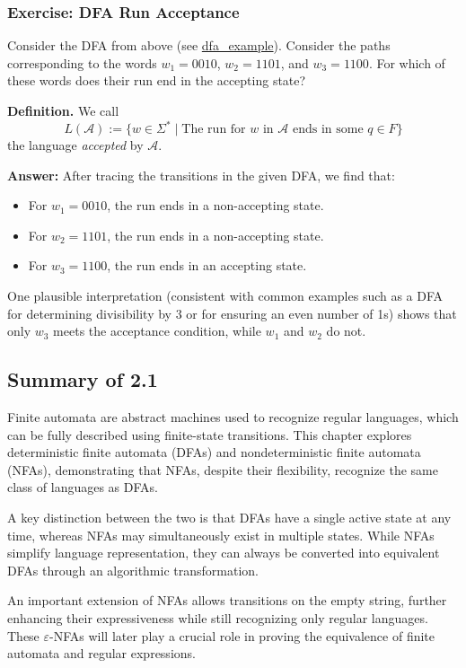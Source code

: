\documentclass{article}
\begin{document}
\subsubsection{Exercise: DFA Run Acceptance}

Consider the DFA from above (see \href{https://hackmd.io/_uploads/ByLSmw_tyl.jpg}{dfa\_example}). Consider the paths corresponding to the words \(w_1 = 0010\), \(w_2 = 1101\), and \(w_3 = 1100\). For which of these words does their run end in the accepting state?

\textbf{Definition.} We call
\[
L(\mathcal{A}) := \{w \in \Sigma^* \; | \; \text{The run for \(w\) in \(\mathcal{A}\) ends in some \(q \in F\)} \}
\]
the language \textit{accepted} by \(\mathcal{A}\).

\textbf{Answer:} After tracing the transitions in the given DFA, we find that:
\begin{itemize}
    \item For \(w_1 = 0010\), the run ends in a non-accepting state.
    \item For \(w_2 = 1101\), the run ends in a non-accepting state.
    \item For \(w_3 = 1100\), the run ends in an accepting state.
\end{itemize}

One plausible interpretation (consistent with common examples such as a DFA for determining divisibility by 3 or for ensuring an even number of 1s) shows that only \(w_3\) meets the acceptance condition, while \(w_1\) and \(w_2\) do not.

\subsection{Summary of 2.1}

Finite automata are abstract machines used to recognize regular languages, which can be fully described using finite-state transitions. This chapter explores deterministic finite automata (DFAs) and nondeterministic finite automata (NFAs), demonstrating that NFAs, despite their flexibility, recognize the same class of languages as DFAs.

A key distinction between the two is that DFAs have a single active state at any time, whereas NFAs may simultaneously exist in multiple states. While NFAs simplify language representation, they can always be converted into equivalent DFAs through an algorithmic transformation.

An important extension of NFAs allows transitions on the empty string, further enhancing their expressiveness while still recognizing only regular languages. These \(\varepsilon\)-NFAs will later play a crucial role in proving the equivalence of finite automata and regular expressions.
\end{document}
